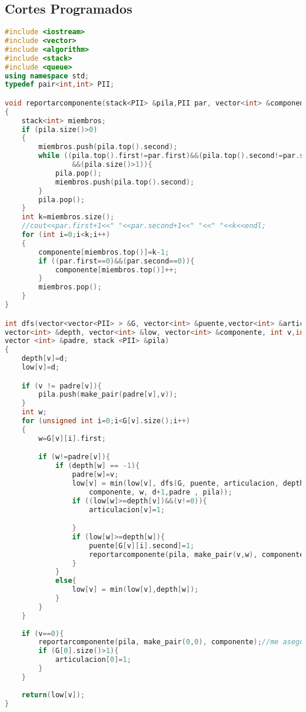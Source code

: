 \documentclass[a4paper]{article}
\begin{document}
\subsection{Cortes Programados}
\begin{lstlisting}[language=c++]
#include <iostream>
#include <vector>
#include <algorithm>
#include <stack>
#include <queue>
using namespace std;
typedef pair<int,int> PII;

void reportarcomponente(stack<PII> &pila,PII par, vector<int> &componente)
{
    stack<int> miembros;
    if (pila.size()>0)
    {
        miembros.push(pila.top().second);
        while ((pila.top().first!=par.first)&&(pila.top().second!=par.second)
        		&&(pila.size()>1)){
            pila.pop();
            miembros.push(pila.top().second);
        }
        pila.pop();
    }
    int k=miembros.size();
    //cout<<par.first+1<<" "<<par.second+1<<" "<<" "<<k<<endl;
    for (int i=0;i<k;i++)
    {
        componente[miembros.top()]=k-1;
        if ((par.first==0)&&(par.second==0)){
            componente[miembros.top()]++;
        }
        miembros.pop();
    }
}

int dfs(vector<vector<PII> > &G, vector<int> &puente,vector<int> &articulacion, 
vector<int> &depth, vector<int> &low, vector<int> &componente, int v,int d, 
vector <int> &padre, stack <PII> &pila)
{
    depth[v]=d;
    low[v]=d;

    if (v != padre[v]){
        pila.push(make_pair(padre[v],v));
    }
	int w;
    for (unsigned int i=0;i<G[v].size();i++)
    {
        w=G[v][i].first;

        if (w!=padre[v]){
            if (depth[w] == -1){
                padre[w]=v;
                low[v] = min(low[v], dfs(G, puente, articulacion, depth , low, 
                	componente, w, d+1,padre , pila));
                if ((low[w]>=depth[v])&&(v!=0)){
                    articulacion[v]=1;

                }
                if (low[w]>=depth[w]){
                    puente[G[v][i].second]=1;
                    reportarcomponente(pila, make_pair(v,w), componente);
                }
            }
            else{
                low[v] = min(low[v],depth[w]);
            }
        }
    }
    
    if (v==0){
        reportarcomponente(pila, make_pair(0,0), componente);//me aseguro vaciarla
        if (G[0].size()>1){
            articulacion[0]=1;
        }
    }
    
    return(low[v]);
}


\end{lstlisting}
\end{document}
